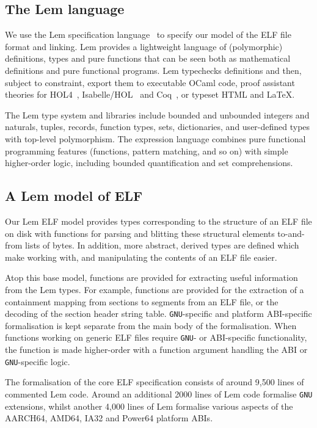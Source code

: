 \subsection{The Lem language}
\label{subsect.rigorous.lem.specification}

We use the Lem specification language~\cite{mulligan-lem-2014} to specify our model of the ELF file format and linking.
Lem provides a lightweight language of (polymorphic) definitions, types and pure functions that can be seen both as mathematical definitions and pure functional programs.
Lem typechecks definitions and then, subject to constraint, export them to executable OCaml code, proof assistant theories for HOL4~\cite{slind-brief-2008}, Isabelle/HOL~\cite{wenzel-isabelle-2008} and Coq~\cite{bertot-short-2008}, or typeset HTML and LaTeX.

The Lem type system and libraries include bounded and unbounded integers and naturals, tuples, records, function types, sets, dictionaries, and user-defined types with top-level polymorphism.
The expression language combines pure functional programming features (functions, pattern matching, and so on) with simple higher-order logic, including bounded quantification and set comprehensions.

\subsection{A Lem model of ELF}
\label{subsect.lem.model.of.elf}

Our Lem ELF model provides types corresponding to the structure of an ELF file on disk with functions for parsing and blitting these structural elements to-and-from lists of bytes.
In addition, more abstract, derived types are defined which make working with, and manipulating the contents of an ELF file easier.

Atop this base model, functions are provided for extracting useful information from the Lem types.
For example, functions are provided for the extraction of a containment mapping from sections to segments from an ELF file, or the decoding of the section header string table.
\texttt{GNU}-specific and platform ABI-specific formalisation is kept separate from the main body of the formalisation.
When functions working on generic ELF files require \texttt{GNU}- or ABI-specific functionality, the function is made higher-order with a function argument handling the ABI or \texttt{GNU}-specific logic.

The formalisation of the core ELF specification consists of around 9,500 lines of commented Lem code.
Around an additional 2000 lines of Lem code formalise \texttt{GNU} extensions, whilst another 4,000 lines of Lem formalise various aspects of the AARCH64, AMD64, IA32 and Power64 platform ABIs.

